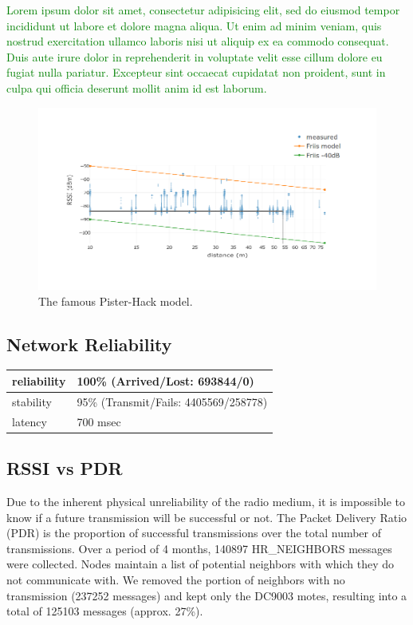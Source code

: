 \documentclass{sig-alternate}
\newcommand{\lorem}               {\textcolor{green}{Lorem ipsum dolor sit amet, consectetur adipisicing elit, sed do eiusmod tempor incididunt ut labore et dolore magna aliqua. Ut enim ad minim veniam, quis nostrud exercitation ullamco laboris nisi ut aliquip ex ea commodo consequat. Duis aute irure dolor in reprehenderit in voluptate velit esse cillum dolore eu fugiat nulla pariatur. Excepteur sint occaecat cupidatat non proident, sunt in culpa qui officia deserunt mollit anim id est laborum.}}
\begin{document}
\lorem

\begin{figure}
    \centering
    \includegraphics[width=\columnwidth]{pister_hack}
    \caption{The famous Pister-Hack model.}
    \label{fig:pister_hack}
\end{figure}

\subsection{Network Reliability}
\label{sec:net_reliability}

\begin{table}
    \begin{tabular}{|l|l|}
        \hline
        reliability & 100\% (Arrived/Lost:   693844/0)\\ \hline
        stability   & 95\% (Transmit/Fails: 4405569/258778)\\ \hline
        latency     & 700 msec\\
        \hline
    \end{tabular}
\end{table}

\subsection{RSSI vs PDR}


Due to the inherent physical unreliability of the radio medium, it is impossible to know if a future transmission will be successful or not.
The Packet Delivery Ratio (PDR) is the proportion of successful transmissions over the total number of transmissions.
Over a period of 4 months, 140897 HR\_NEIGHBORS messages were collected.
Nodes maintain a list of potential neighbors with which they do not communicate with.
We removed the portion of neighbors with no transmission (237252 messages) and kept only the DC9003 motes, resulting into a total of 125103 messages (approx. 27\%).
\end{document}
